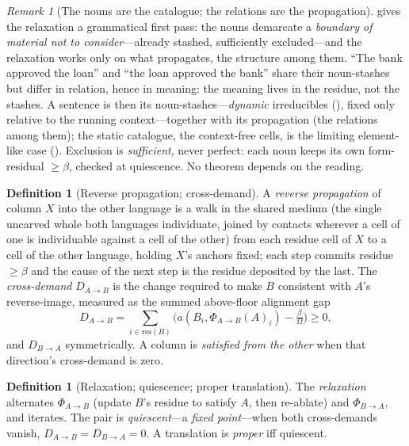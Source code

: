 \documentclass[twocolumn,11pt,a4paper]{article}
\theoremstyle{sup}
\theoremstyle{definition}
\newtheorem{definition}[theorem]{Definition}
\theoremstyle{remark}
\newtheorem{remark}[theorem]{Remark}
\newcommand{\flo}{\beta}
\newcommand{\al}{a}
\newcommand{\Om}{\Omega}
\newcommand{\dem}{D}
\newcommand{\colA}{A}
\newcommand{\colB}{B}
\newcommand{\rlx}{\Phi}
\begin{document}
\begin{remark}[The nouns are the catalogue; the relations are the propagation]
\label{rem:noun-catalogue}
 gives the relaxation a grammatical first pass: the nouns demarcate
a \emph{boundary of material not to consider}---already stashed, sufficiently
excluded---and the relaxation works only on what propagates, the structure among
them. ``The bank approved the loan'' and ``the loan approved the bank'' share
their noun-stashes but differ in relation, hence in meaning: the meaning lives in
the residue, not the stashes. A sentence is then its noun-stashes---\emph{dynamic}
irreducibles (), fixed only relative to the running
context---together with its propagation (the relations among them); the static
catalogue, the context-free cells, is the limiting element-like case
(). Exclusion is
\emph{sufficient}, never perfect: each noun keeps its own form-residual $\ge\flo$,
checked at quiescence. No theorem depends on the reading.
\end{remark}

\begin{definition}[Reverse propagation; cross-demand]
\label{def:demand}
A \emph{reverse propagation} of column $X$ into the other language is a walk in
the shared medium (the single uncarved whole both languages individuate, joined
by contacts wherever a cell of one is individuable against a cell of the other)
from each residue cell of $X$ to a cell of the other language, holding $X$'s
anchors fixed; each step commits residue $\ge\flo$ and the cause of the next step
is the residue deposited by the last. The \emph{cross-demand}
$\dem_{\colA\to\colB}$ is the change required to make $\colB$ consistent with
$\colA$'s reverse-image, measured as the summed above-floor alignment gap
\[
\dem_{\colA\to\colB}=\!\!\sum_{i\in\mathrm{res}(\colB)}\!\!
\bigl(\al(\colB_i,\rlx_{\colA\to\colB}(\colA)_i)-\tfrac{\flo}{\Om}\bigr)\ge0,
\]
and $\dem_{\colB\to\colA}$ symmetrically. A column is \emph{satisfied from the
other} when that direction's cross-demand is zero.
\end{definition}

\begin{definition}[Relaxation; quiescence; proper translation]
\label{def:relax}
The \emph{relaxation} alternates $\rlx_{\colA\to\colB}$ (update $\colB$'s residue
to satisfy $\colA$, then re-ablate) and $\rlx_{\colB\to\colA}$, and iterates. The
pair is \emph{quiescent}---a \emph{fixed point}---when both cross-demands vanish,
$\dem_{\colA\to\colB}=\dem_{\colB\to\colA}=0$. A translation is \emph{proper}
iff quiescent.
\end{definition}
\end{document}
